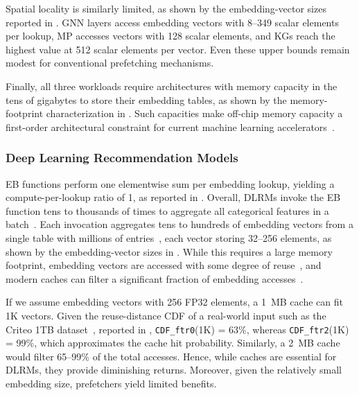 Spatial locality is similarly limited, as shown by the embedding-vector sizes reported in . GNN layers access embedding vectors with 8--349 scalar elements per lookup, MP accesses vectors with 128 scalar elements, and KGs reach the highest value at 512 scalar elements per vector. Even these upper bounds remain modest for conventional prefetching mechanisms.

Finally, all three workloads require architectures with memory capacity in the tens of gigabytes to store their embedding tables, as shown by the memory-footprint characterization in . Such capacities make off-chip memory capacity a first-order architectural constraint for current machine learning accelerators~\cite{nvidia2024h100,jouppi2023isca}.

\subsubsection{Deep Learning Recommendation Models} \label{sec:embedding-characterization-dlrms}  %

EB functions perform one elementwise sum per embedding lookup, yielding a compute-per-lookup ratio of 1, as reported in . Overall, DLRMs invoke the EB function tens to thousands of times to aggregate all categorical features in a batch~\cite{ibrahim2022memsys,gupta2020isca}. Each invocation aggregates tens to hundreds of embedding vectors from a single table with millions of entries~\cite{ibrahim2022memsys}, each vector storing 32--256 elements, as shown by the embedding-vector sizes in . While this requires a large memory footprint, embedding vectors are accessed with some degree of reuse~\cite{sethi2022asplos,ginart2021isit,joglekar2020neural,acun2021hpca,wang2022sc}, and modern caches can filter a significant fraction of embedding accesses~\cite{ibrahim2022memsys}.

If we assume embedding vectors with 256 FP32 elements, a 1~MB cache can fit 1K vectors. Given the reuse-distance CDF of a real-world input such as the Criteo 1TB dataset~\cite{criteo2024dataset}, reported in , \texttt{CDF\_ftr0}(1K) = 63\%, whereas \texttt{CDF\_ftr2}(1K) = 99\%, which approximates the cache hit probability. Similarly, a 2~MB cache would filter 65--99\% of the total accesses. Hence, while caches are essential for DLRMs, they provide diminishing returns. Moreover, given the relatively small embedding size, prefetchers yield limited benefits.

